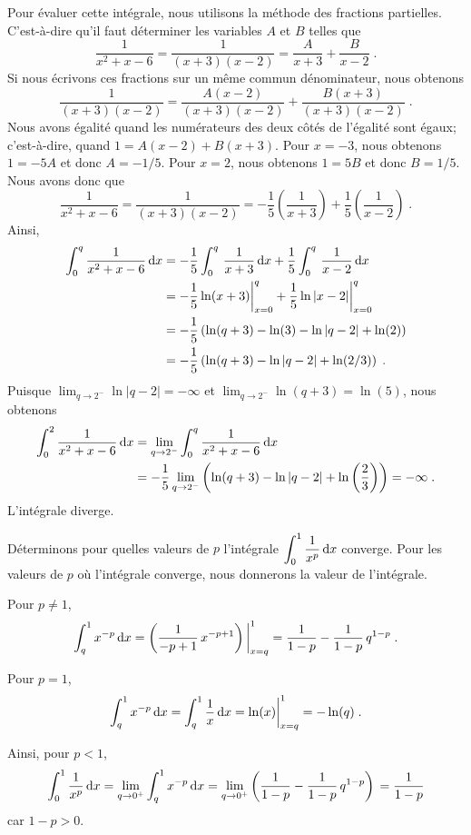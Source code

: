 {\begin{egg}
Pour évaluer cette intégrale, nous utilisons la méthode des fractions
partielles.  C'est-à-dire qu'il faut déterminer les variables $A$ et $B$
telles que
\[
\frac{1}{x^2+x-6} = \frac{1}{(x+3)(x-2)} = \frac{A}{x+3} + \frac{B}{x-2} \; .
\]
Si nous écrivons ces fractions sur un même commun dénominateur, nous obtenons
\[
\frac{1}{(x+3)(x-2)} = \frac{A(x-2)}{(x+3)(x-2)} +
\frac{B(x+3)}{(x+3)(x-2)} \; .
\]
Nous avons égalité quand les numérateurs des deux côtés de
l'égalité sont égaux; c'est-à-dire, quand $1=A(x-2)+B(x+3)$.  Pour
$x=-3$, nous obtenons $1=-5A$ et donc $A=-1/5$.  Pour $x=2$, nous
obtenons $1=5B$ et donc $B=1/5$.  Nous avons donc que
\[
\frac{1}{x^2+x-6} = \frac{1}{(x+3)(x-2)}
= - \frac{1}{5} \left(\frac{1}{x+3} \right)
+ \frac{1}{5} \left(\frac{1}{x-2}\right) \; .
\]
Ainsi,
\begin{align*}
\int_0^q \frac{1}{x^2+x-6} \,\mathrm{d}x &= 
- \frac{1}{5} \int_0^q \,\frac{1}{x+3} \,\mathrm{d}x
+ \frac{1}{5} \int_0^q \,\frac{1}{x-2} \,\mathrm{d}x \\
&= -\frac{1}{5} \ln(x+3) \bigg|_{x=0}^q 
+ \frac{1}{5} \ln|x-2| \bigg|_{x=0}^q \\
&= -\frac{1}{5} \left( \ln(q+3) - \ln(3) - \ln|q-2| + \ln(2) \right) \\
&= -\frac{1}{5} \left( \ln(q+3) -\ln|q-2| + \ln(2/3) \right) \; .
\end{align*}
Puisque $\displaystyle \lim_{q\rightarrow 2^-} \ln|q-2| = -\infty$ et
$\displaystyle \lim_{q\rightarrow 2^-} \ln(q+3) = \ln(5)$, nous obtenons
\begin{align*}
\int_0^2 \frac{1}{x^2+x-6} \,\mathrm{d}x
&= \lim_{q\rightarrow 2^-} \int_0^q \frac{1}{x^2+x-6} \,\mathrm{d}x \\
&= - \frac{1}{5} \lim_{q\rightarrow 2^-}
\left( \ln(q+3) -\ln|q-2|
+ \ln\left(\frac{2}{3}\right) \right) = -\infty \; .
\end{align*}
L'intégrale diverge.
\end{egg}

Déterminons pour quelles valeurs de $p$ l'intégrale
$\displaystyle \int_0^1 \frac{1}{x^p} \,\mathrm{d}x$ converge.  Pour les
valeurs de $p$ où l'intégrale converge, nous donnerons la valeur de
l'intégrale.

Pour $p\neq 1$,
\[
\int_q^1 x^{-p} \,\mathrm{d}x
= \left( \frac{1}{-p+1} \, x^{-p+1} \right)\bigg|_{x=q}^1
= \frac{1}{1-p} - \frac{1}{1-p} \, q^{1-p} \; .
\]

Pour $p=1$,
\[
\int_q^1 x^{-p} \,\mathrm{d}x = \int_q^1 \frac{1}{x} \,\mathrm{d}x
= \ln(x)\bigg|_{x=q}^1 = - \ln(q) \; .
\]

Ainsi, pour $p<1$,
\[
\int_0^1 \frac{1}{x^p} \,\mathrm{d}x
= \lim_{q\rightarrow 0^+} \int_q^1 x^{-p} \,\mathrm{d}x
= \lim_{q\rightarrow 0^+}
\left( \frac{1}{1-p} - \frac{1}{1-p} \, q^{1-p} \right) \\
= \frac{1}{1-p}
\]
car $1-p>0$.

}
